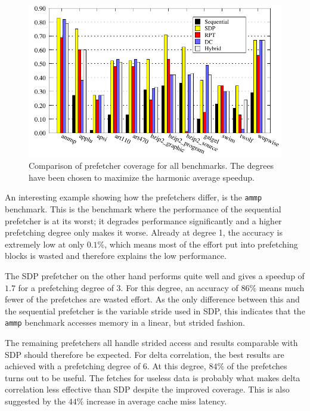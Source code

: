 \begin{figure}
  \centering
  \includegraphics{plots/coverage_overview.pdf}
  \caption{
      Comparison of prefetcher coverage for all benchmarks.
      The degrees have been chosen to maximize the harmonic average speedup.
  }
  \label{fig:coverage}
\end{figure}


An interesting example showing how the prefetchers differ, is the \texttt{ammp}
benchmark.
This is the benchmark where the performance of the sequential prefetcher is at
its worst;
it degrades performance significantly and a higher prefetching degree only makes
it worse.
Already at degree 1, the accuracy is extremely low at only $0.1\%$, which means
most of the effort put into prefetching blocks is wasted and therefore explains
the low performance.

The SDP prefetcher on the other hand performs quite well and gives a speedup of
$1.7$ for a prefetching degree of $3$.
For this degree, an accuracy of $86\%$ means much fewer of the prefetches are
wasted effort.
As the only difference between this and the sequential prefetcher is the
variable stride used in SDP,
this indicates that the \texttt{ammp} benchmark accesses memory in a linear,
but strided fashion.

The remaining prefetchers all handle strided access and results comparable with
SDP should therefore be expected. 
For delta correlation, the best results are achieved with a prefetching degree
of $6$.
At this degree, $84\%$ of the prefetches turns out to be useful.
The fetches for useless data is probably what makes delta correlation less
effective than SDP despite the improved coverage.
This is also suggested by the $44\%$ increase in average cache miss latency.

